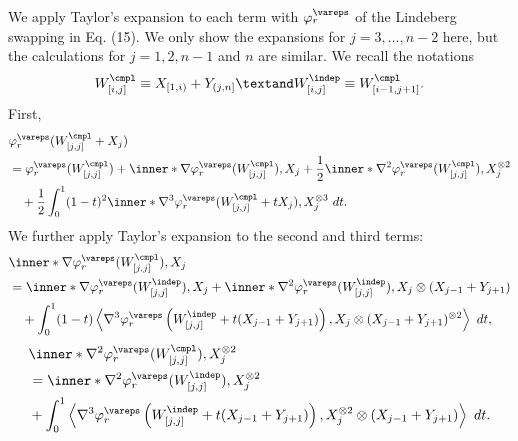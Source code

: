 \documentclass[aos]{imsart}
\begin{document}
\begin{appendix}
We apply Taylor's expansion to each term with $\varphi_r^\vareps$ of the Lindeberg swapping in Eq. (15). We only show the expansions for $j = 3, \dots, n-2$ here, but the calculations for $j= 1, 2, n-1$ and $n$ are similar. We recall the notations
\begin{equation*}
    W_{[i,j]}^\cmpl \equiv X_{[1,i)} + Y_{(j,n]} \textand
    W_{[i,j]}^{\indep} \equiv W_{[i-1,j+1]}^\cmpl.
\end{equation*}
First,
\begin{equation*}
\begin{aligned}
    & \varphi_r^\vareps(W^\cmpl_{[j,j]} + X_j)\\
    & = \varphi_r^\vareps(W^\cmpl_{[j,j]})
    + \inner*{ \nabla \varphi_r^\vareps(W^\cmpl_{[j,j]}), X_j}
    + \frac{1}{2} \inner*{ 
    \nabla^2 \varphi_r^\vareps(W^\cmpl_{[j,j]}), X_j^{\otimes 2}} \\
    & \quad + \frac{1}{2} \int_0^1 (1-t)^2 \inner*{
    \nabla^3 \varphi_r^\vareps(W^\cmpl_{[j,j]} + t X_j), X_j^{\otimes 3}} ~dt.
\end{aligned}
\end{equation*}
We further apply Taylor's expansion to the second and third terms:
\begin{equation*}
\begin{aligned}
    & \inner*{ \nabla \varphi_r^\vareps(W^\cmpl_{[j,j]}), X_j} \\
    & = \inner*{ \nabla \varphi_r^\vareps(W_{[j,j]}^{\indep}), X_j} 
    + \inner*{ 
    \nabla^2 \varphi_r^\vareps(W_{[j,j]}^{\indep}),   X_j 
    \otimes (X_{j-1} + Y_{j+1})} \\
    & \quad + \int_0^1 (1-t) \left\langle
        \nabla^3 \varphi_r^\vareps\left(
            W_{[j,j]}^{\indep} + t (X_{j-1} + Y_{j+1}) 
        \right), 
        X_j \otimes (X_{j-1} + Y_{j+1})^{\otimes 2}
    \right\rangle ~dt,
\end{aligned}
\end{equation*}
\begin{equation*}
\begin{aligned}
    & \inner*{ 
        \nabla^2 \varphi_r^\vareps(W^\cmpl_{[j,j]}), X_j^{\otimes 2}} \\
    & = \inner*{\nabla^2 \varphi_r^\vareps(W_{[j,j]}^{\indep}), X_j^{\otimes 2}} \\
    & + \int_0^1 \left\langle
        \nabla^3 \varphi_r^\vareps\left(
              W_{[j,j]}^{\indep} + t (X_{j-1} + Y_{j+1})
        \right), 
        X_j^{\otimes 2} \otimes (X_{j-1} + Y_{j+1})\right\rangle ~dt.
\end{aligned}
\end{equation*}


\end{appendix}
\end{document}
